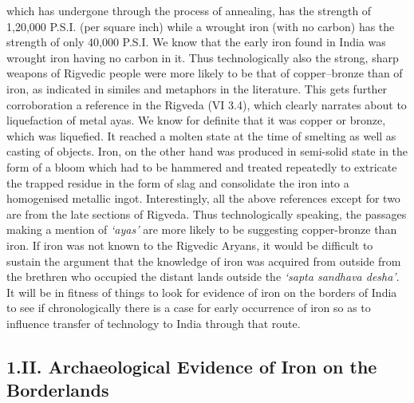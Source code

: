 which has undergone through the process of annealing, has the strength of 1,20,000 P.S.I. (per square inch) while a wrought iron (with no carbon) has the strength of only 40,000 P.S.I. We know that the early iron found in India was wrought iron having no carbon in it. Thus technologically also the strong, sharp weapons of Rigvedic people were more likely to be that of copper–bronze than of iron, as indicated in similes and metaphors in the literature. This gets further corroboration a reference in the Rigveda (VI 3.4), which clearly narrates about to liquefaction of metal ayas. We know for definite that it was copper or bronze, which was liquefied. It reached a molten state at the time of smelting as well as casting of objects. Iron, on the other hand was produced in semi-solid state in the form of a bloom which had to be hammered and treated repeatedly to extricate the trapped residue in the form of slag and consolidate the iron into a homogenised metallic ingot. Interestingly, all the above references except for two are from the late sections of Rigveda. Thus technologically speaking, the passages making a mention of \textit{‘ayas’} are more likely to be suggesting copper-bronze than iron. If iron was not known to the Rigvedic Aryans, it would be difficult to sustain the argument that the knowledge of iron was acquired from outside from the brethren who occupied the distant lands outside the \textit{‘sapta sandhava desha’}. It will be in fitness of things to look for evidence of iron on the borders of India to see if chronologically there is a case for early occurrence of iron so as to influence transfer of technology to India through that route. 

\vspace{-.3cm}

\subsection*{1.II. Archaeological Evidence of Iron on the\\ Borderlands}\label{chapter3-subsection-2}

\vspace{-.2cm}

